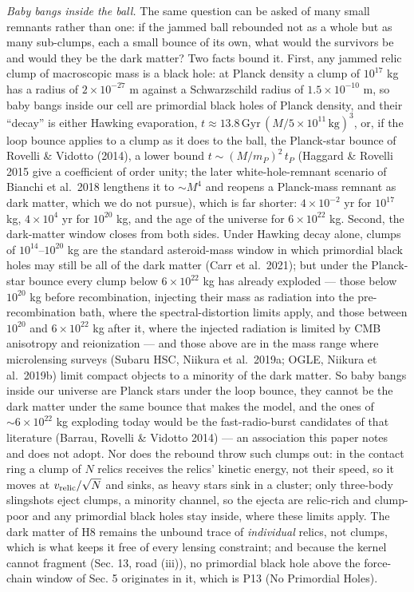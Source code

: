 \documentclass[
  11pt,
]{article}
\begin{document}
\emph{Baby bangs inside the ball.} The same question can be asked of
many small remnants rather than one: if the jammed ball rebounded not as
a whole but as many sub-clumps, each a small bounce of its own, what
would the survivors be and would they be the dark matter? Two facts
bound it. First, any jammed relic clump of macroscopic mass is a black
hole: at Planck density a clump of \(10^{17}\) kg has a radius of
\(2\times10^{-27}\) m against a Schwarzschild radius of
\(1.5\times10^{-10}\) m, so baby bangs inside our cell are primordial
black holes of Planck density, and their ``decay'' is either Hawking
evaporation,
\(t \approx 13.8\,\mathrm{Gyr}\,(M/5\times10^{11}\,\mathrm{kg})^3\), or,
if the loop bounce applies to a clump as it does to the ball, the
Planck-star bounce of Rovelli \& Vidotto (2014), a lower bound
\(t \sim (M/m_P)^2\,t_P\) (Haggard \& Rovelli 2015 give a coefficient of
order unity; the later white-hole-remnant scenario of Bianchi et
al.~2018 lengthens it to \(\sim M^4\) and reopens a Planck-mass remnant
as dark matter, which we do not pursue), which is far shorter:
\(4\times10^{-2}\) yr for \(10^{17}\) kg, \(4\times10^{4}\) yr for
\(10^{20}\) kg, and the age of the universe for \(6\times10^{22}\) kg.
Second, the dark-matter window closes from both sides. Under Hawking
decay alone, clumps of \(10^{14}\)--\(10^{20}\) kg are the standard
asteroid-mass window in which primordial black holes may still be all of
the dark matter (Carr et al.~2021); but under the Planck-star bounce
every clump below \(6\times10^{22}\) kg has already exploded --- those
below \(10^{20}\) kg before recombination, injecting their mass as
radiation into the pre-recombination bath, where the spectral-distortion
limits apply, and those between \(10^{20}\) and \(6\times10^{22}\) kg
after it, where the injected radiation is limited by CMB anisotropy and
reionization --- and those above are in the mass range where
microlensing surveys (Subaru HSC, Niikura et al.~2019a; OGLE, Niikura et
al.~2019b) limit compact objects to a minority of the dark matter. So
baby bangs inside our universe are Planck stars under the loop bounce,
they cannot be the dark matter under the same bounce that makes the
model, and the ones of \(\sim 6\times10^{22}\) kg exploding today would
be the fast-radio-burst candidates of that literature (Barrau, Rovelli
\& Vidotto 2014) --- an association this paper notes and does not adopt.
Nor does the rebound throw such clumps out: in the contact ring a clump
of \(N\) relics receives the relics' kinetic energy, not their speed, so
it moves at \(v_{\rm relic}/\sqrt{N}\) and sinks, as heavy stars sink in
a cluster; only three-body slingshots eject clumps, a minority channel,
so the ejecta are relic-rich and clump-poor and any primordial black
holes stay inside, where these limits apply. The dark matter of H8
remains the unbound trace of \emph{individual} relics, not clumps, which
is what keeps it free of every lensing constraint; and because the
kernel cannot fragment (Sec. 13, road (iii)), no primordial black hole
above the force-chain window of Sec. 5 originates in it, which is P13
(No Primordial Holes).
\end{document}
